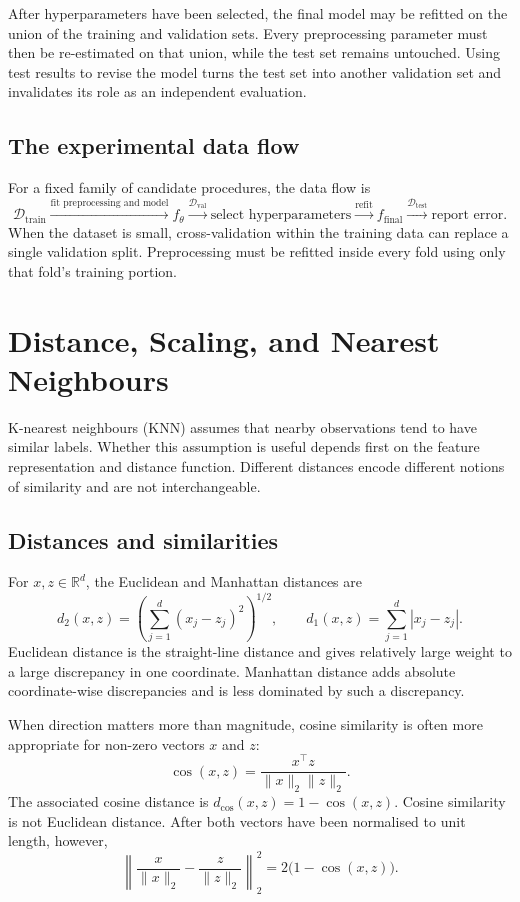 After hyperparameters have been selected, the final model may be refitted on
the union of the training and validation sets. Every preprocessing parameter
must then be re-estimated on that union, while the test set remains untouched.
Using test results to revise the model turns the test set into another
validation set and invalidates its role as an independent evaluation.

\subsection{The experimental data flow}

For a fixed family of candidate procedures, the data flow is
\[
\mathcal D_{\mathrm{train}}
\xrightarrow{\text{fit preprocessing and model}}
f_{\theta}
\xrightarrow{\mathcal D_{\mathrm{val}}}
\text{select hyperparameters}
\xrightarrow{\text{refit}}
f_{\mathrm{final}}
\xrightarrow{\mathcal D_{\mathrm{test}}}
\text{report error}.
\]
When the dataset is small, cross-validation within the training data can
replace a single validation split. Preprocessing must be refitted inside every
fold using only that fold's training portion.

\TrainingPipelineFigure


\section{Distance, Scaling, and Nearest Neighbours}

K-nearest neighbours (KNN) assumes that nearby observations tend to have
similar labels. Whether this assumption is useful depends first on the feature
representation and distance function. Different distances encode different
notions of similarity and are not interchangeable.

\subsection{Distances and similarities}

For $x,z\in\mathbb R^d$, the Euclidean and Manhattan distances are
\[
d_2(x,z)=\left(\sum_{j=1}^{d}(x_j-z_j)^2\right)^{1/2},
\qquad
d_1(x,z)=\sum_{j=1}^{d}|x_j-z_j|.
\]
Euclidean distance is the straight-line distance and gives relatively large
weight to a large discrepancy in one coordinate. Manhattan distance adds
absolute coordinate-wise discrepancies and is less dominated by such a
discrepancy.

When direction matters more than magnitude, cosine similarity is often more
appropriate for non-zero vectors $x$ and $z$:
\[
\operatorname{cos}(x,z)=\frac{x^\top z}
{\lVert x\rVert_2\lVert z\rVert_2}.
\]
The associated cosine distance is
$d_{\cos}(x,z)=1-\operatorname{cos}(x,z)$. Cosine similarity is not Euclidean
distance. After both vectors have been normalised to unit length, however,
\[
\left\lVert\frac{x}{\lVert x\rVert_2}-
\frac{z}{\lVert z\rVert_2}\right\rVert_2^2
=2\bigl(1-\operatorname{cos}(x,z)\bigr).
\]

